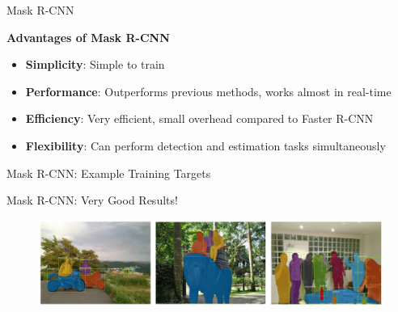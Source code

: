\begin{frame}[allowframebreaks]{Mask R-CNN}

\framebreak

    \textbf{Advantages of Mask R-CNN}
    \begin{itemize}
        \item \textbf{Simplicity}: Simple to train
        \item \textbf{Performance}: Outperforms previous methods, works almost in real-time
        \item \textbf{Efficiency}: Very efficient, small overhead compared to Faster R-CNN
        \item \textbf{Flexibility}: Can perform detection and estimation tasks simultaneously
    \end{itemize}
\end{frame}

\begin{frame}{Mask R-CNN: Example Training Targets}
\end{frame}

\begin{frame}{Mask R-CNN: Very Good Results!}
    \begin{figure}
        \centering
        \includegraphics[width=1.0\textwidth,height=1.0\textheight,keepaspectratio]{images/object-detect/ins_9.png}
    \end{figure}
\end{frame}